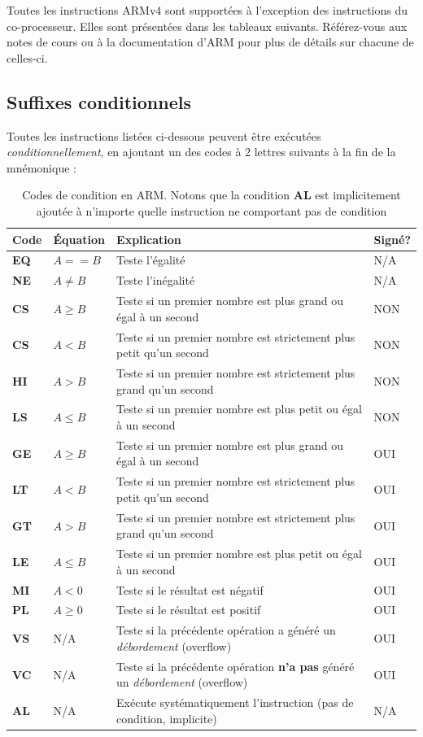 \documentclass{tufte-handout}
\begin{document}
Toutes les instructions ARMv4 sont supportées à l'exception des instructions du co-processeur. Elles sont présentées dans les tableaux suivants. Référez-vous aux notes de cours ou à la documentation d'ARM pour plus de détails sur chacune de celles-ci.

\subsection{Suffixes conditionnels}
Toutes les instructions listées ci-dessous peuvent être exécutées \emph{conditionnellement}, en ajoutant un des codes à 2 lettres suivants à la fin de la mnémonique :

\begin{table}
\begin{tabular}{l|p{2cm}p{6cm}l}
Code & Équation & Explication & Signé? \\ \hline
\textbf{EQ}	& $A == B$ & Teste l'égalité & N/A \\
\textbf{NE}	& $A \neq B$ & Teste l'inégalité & N/A \\ \hline
\textbf{CS}	& $A \geq B$ & Teste si un premier nombre est plus grand ou égal à un second & NON \\
\textbf{CS}	& $A < B$ & Teste si un premier nombre est strictement plus petit qu'un second & NON \\
\textbf{HI}	& $A > B$ & Teste si un premier nombre est strictement plus grand qu'un second & NON \\
\textbf{LS}	& $A \leq B$ & Teste si un premier nombre est plus petit ou égal à un second & NON \\ \hline
\textbf{GE}	& $A \geq B$ & Teste si un premier nombre est plus grand ou égal à un second & OUI \\
\textbf{LT}	& $A < B$ & Teste si un premier nombre est strictement plus petit qu'un second & OUI \\
\textbf{GT}	& $A > B$ & Teste si un premier nombre est strictement plus grand qu'un second & OUI \\
\textbf{LE}	& $A \leq B$ & Teste si un premier nombre est plus petit ou égal à un second & OUI \\ \hline
\textbf{MI}	& $A < 0$ & Teste si le résultat est négatif & OUI \\
\textbf{PL}	& $A \geq 0$ & Teste si le résultat est positif & OUI \\ \hline
\textbf{VS}	& N/A & Teste si la précédente opération a généré un \textit{débordement} (overflow) & OUI \\
\textbf{VC}	& N/A & Teste si la précédente opération \textbf{n'a pas} généré un \textit{débordement} (overflow) & OUI \\ \hline
\textbf{AL}	& N/A & Exécute systématiquement l'instruction (pas de condition, implicite) & N/A \\
\end{tabular}
\caption{Codes de condition en ARM. Notons que la condition \textbf{AL} est implicitement ajoutée à n'importe quelle instruction ne comportant pas de condition}
\end{table}
\end{document}
